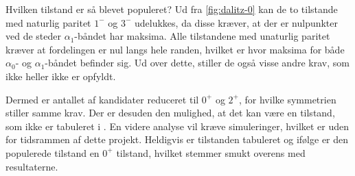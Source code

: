 Hvilken tilstand er så blevet populeret? Ud fra \cref{fig:dalitz-0} kan de to tilstande med naturlig
paritet $1^{-}$ og $3^{-}$ udelukkes, da disse kræver, at der er nulpunkter ved de steder
$\alpha_{1}$-båndet har maksima. Alle tilstandene med unaturlig paritet kræver at fordelingen er nul
langs hele randen, hvilket er hvor maksima for både $\alpha_{0}$- og $\alpha_{1}$-båndet befinder sig. Ud over
dette, stiller de også visse andre krav, som ikke heller ikke er opfyldt.

Dermed er antallet af kandidater reduceret til $0^{+}$ og $2^{+}$, for hvilke symmetrien stiller
samme krav. Der er desuden den mulighed, at det kan være en tilstand, som ikke er tabuleret i
\cite{Fedorov}. En videre analyse vil kræve simuleringer, hvilket er uden for tidsrammen af dette
projekt. Heldigvis er tilstanden tabuleret og ifølge \cite{States} er den
populerede tilstand en $0^{+}$ tilstand, hvilket stemmer smukt overens med resultaterne.
















